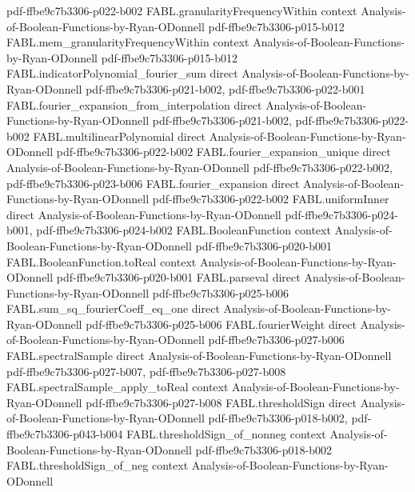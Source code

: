 \begin{theorem}
  {pdf-ffbe9c7b3306-p022-b002}
\proofstep
  {FABL.granularityFrequencyWithin}
  {context}
  {Analysis-of-Boolean-Functions-by-Ryan-ODonnell}
  {pdf-ffbe9c7b3306-p015-b012}
\proofstep
  {FABL.mem_granularityFrequencyWithin}
  {context}
  {Analysis-of-Boolean-Functions-by-Ryan-ODonnell}
  {pdf-ffbe9c7b3306-p015-b012}
\proofstep
  {FABL.indicatorPolynomial_fourier_sum}
  {direct}
  {Analysis-of-Boolean-Functions-by-Ryan-ODonnell}
  {pdf-ffbe9c7b3306-p021-b002,
    pdf-ffbe9c7b3306-p022-b001}
\proofstep
  {FABL.fourier_expansion_from_interpolation}
  {direct}
  {Analysis-of-Boolean-Functions-by-Ryan-ODonnell}
  {pdf-ffbe9c7b3306-p021-b002,
    pdf-ffbe9c7b3306-p022-b002}
\proofstep
  {FABL.multilinearPolynomial}
  {direct}
  {Analysis-of-Boolean-Functions-by-Ryan-ODonnell}
  {pdf-ffbe9c7b3306-p022-b002}
\proofstep
  {FABL.fourier_expansion_unique}
  {direct}
  {Analysis-of-Boolean-Functions-by-Ryan-ODonnell}
  {pdf-ffbe9c7b3306-p022-b002,
    pdf-ffbe9c7b3306-p023-b006}
\proofstep
  {FABL.fourier_expansion}
  {direct}
  {Analysis-of-Boolean-Functions-by-Ryan-ODonnell}
  {pdf-ffbe9c7b3306-p022-b002}
\proofstep
  {FABL.uniformInner}
  {direct}
  {Analysis-of-Boolean-Functions-by-Ryan-ODonnell}
  {pdf-ffbe9c7b3306-p024-b001,
    pdf-ffbe9c7b3306-p024-b002}
\proofstep
  {FABL.BooleanFunction}
  {context}
  {Analysis-of-Boolean-Functions-by-Ryan-ODonnell}
  {pdf-ffbe9c7b3306-p020-b001}
\proofstep
  {FABL.BooleanFunction.toReal}
  {context}
  {Analysis-of-Boolean-Functions-by-Ryan-ODonnell}
  {pdf-ffbe9c7b3306-p020-b001}
\proofstep
  {FABL.parseval}
  {direct}
  {Analysis-of-Boolean-Functions-by-Ryan-ODonnell}
  {pdf-ffbe9c7b3306-p025-b006}
\proofstep
  {FABL.sum_sq_fourierCoeff_eq_one}
  {direct}
  {Analysis-of-Boolean-Functions-by-Ryan-ODonnell}
  {pdf-ffbe9c7b3306-p025-b006}
\proofstep
  {FABL.fourierWeight}
  {direct}
  {Analysis-of-Boolean-Functions-by-Ryan-ODonnell}
  {pdf-ffbe9c7b3306-p027-b006}
\proofstep
  {FABL.spectralSample}
  {direct}
  {Analysis-of-Boolean-Functions-by-Ryan-ODonnell}
  {pdf-ffbe9c7b3306-p027-b007,
    pdf-ffbe9c7b3306-p027-b008}
\proofstep
  {FABL.spectralSample_apply_toReal}
  {context}
  {Analysis-of-Boolean-Functions-by-Ryan-ODonnell}
  {pdf-ffbe9c7b3306-p027-b008}
\proofstep
  {FABL.thresholdSign}
  {direct}
  {Analysis-of-Boolean-Functions-by-Ryan-ODonnell}
  {pdf-ffbe9c7b3306-p018-b002,
    pdf-ffbe9c7b3306-p043-b004}
\proofstep
  {FABL.thresholdSign_of_nonneg}
  {context}
  {Analysis-of-Boolean-Functions-by-Ryan-ODonnell}
  {pdf-ffbe9c7b3306-p018-b002}
\proofstep
  {FABL.thresholdSign_of_neg}
  {context}
  {Analysis-of-Boolean-Functions-by-Ryan-ODonnell}

\end{theorem}
